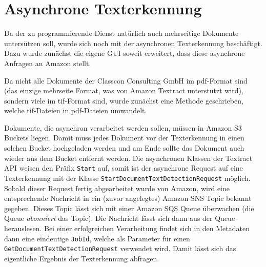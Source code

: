 \documentclass{whswinvcbook}
\begin{document}
\section{Asynchrone Texterkennung}
Da der zu programmierende Dienst natürlich auch mehrseitige Dokumente untersützen soll, wurde sich noch mit der asynchronen Texterkennung beschäftigt. Dazu wurde zunächst die eigene GUI soweit erweitert, dass diese asynchrone Anfragen an Amazon stellt.

Da nicht alle Dokumente der Classcon Consulting GmbH im pdf-Format sind (das einzige mehrseite Format, was von Amazon Textract unterstützt wird), sondern viele im tif-Format sind, wurde zunächst eine Methode geschrieben, welche tif-Dateien in pdf-Dateien umwandelt.

Dokumente, die asynchron verarbeitet werden sollen, müssen in Amazon S3 Buckets liegen. Damit muss jedes Dokument vor der Texterkennung in einen solchen Bucket hochgeladen werden und am Ende sollte das Dokument auch wieder aus dem Bucket entfernt werden. Die asynchronen Klassen der Textract API weisen den Präfix \texttt{Start} auf, somit ist der asynchrone Request auf eine Texterkennung mit der Klasse \texttt{StartDocumentTextDetectionRequest} möglich. Sobald dieser Request fertig abgearbeitet wurde von Amazon, wird eine entsprechende Nachricht in ein (zuvor angelegtes) Amazon SNS Topic bekannt gegeben. Dieses Topic lässt sich mit einer Amazon SQS Queue überwachen (die Queue \textit{abonniert} das Topic). Die Nachricht lässt sich dann aus der Queue herauslesen. Bei einer erfolgreichen Verarbeitung findet sich in den Metadaten dann eine eindeutige \texttt{JobId}, welche als Parameter für einen \texttt{GetDocumentTextDetectionRequest} verwendet wird. Damit lässt sich das eigentliche Ergebnis der Texterkennung abfragen.
\end{document}
